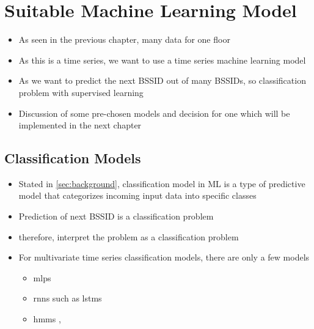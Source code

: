 \chapter{Suitable Machine Learning Model}\label{sec:discuss-ml}


\begin{itemize}
    \item As seen in the previous chapter, many data for one floor 
    \item As this is a time series, we want to use a time series machine learning model
    \item As we want to predict the next BSSID out of many BSSIDs, so classification problem with supervised learning
    \item Discussion of some pre-chosen models and decision for one which will be implemented in the next chapter
\end{itemize}

\section{Classification Models}
\begin{itemize}
    \item Stated in \cref{sec:background}, classification model in ML is a type of predictive model that categorizes incoming input data into specific classes
    \item Prediction of next BSSID is a classification problem
    \item therefore, interpret the problem as a classification problem
    \item For multivariate time series classification models, there are only a few models
    \begin{itemize}
        \item \acp{mlp} \cite{TSC}
        \item \acp{rnn} such as \acp{lstm}\cite{lstm-hochreiter}
        \item \acp{hmm} \cite{hmm-movement-prediction}, 
    \end{itemize}
\end{itemize}


